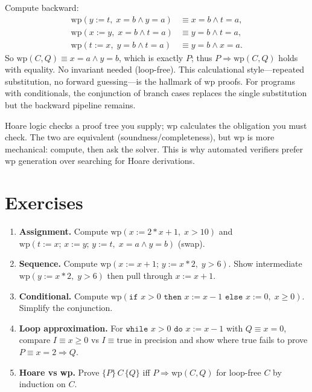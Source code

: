 Compute backward:
\[
\begin{aligned}
\text{wp}(y:=t,\;x=b\land y=a) &\equiv x=b\land t=a,\\
\text{wp}(x:=y,\;x=b\land t=a) &\equiv y=b\land t=a,\\
\text{wp}(t:=x,\;y=b\land t=a) &\equiv y=b\land x=a.
\end{aligned}
\]
So $\text{wp}(C,Q)\equiv x=a\land y=b$, which is exactly $P$; thus $P\Rightarrow\text{wp}(C,Q)$ holds with equality. No invariant needed (loop-free). This calculational style—repeated substitution, no forward guessing—is the hallmark of $\text{wp}$ proofs. For programs with conditionals, the conjunction of branch cases replaces the single substitution but the backward pipeline remains.

\begin{remark}
Hoare logic checks a proof tree you supply; $\text{wp}$ calculates the obligation you must check. The two are equivalent (soundness/completeness), but $\text{wp}$ is more mechanical: compute, then ask the solver. This is why automated verifiers prefer $\text{wp}$ generation over searching for Hoare derivations.
\end{remark}

\section{Exercises}
\label{sec:ch06-exercises}
\begin{enumerate}[label=E6.\arabic*, leftmargin=*, itemsep=0.6em]
    \item \textbf{Assignment.} Compute $\text{wp}(x:=2*x+1,\;x>10)$ and $\text{wp}(t:=x;\,x:=y;\,y:=t,\;x=a\land y=b)$ (swap).
    \item \textbf{Sequence.} Compute $\text{wp}(x:=x+1;\,y:=x*2,\;y>6)$. Show intermediate $\text{wp}(y:=x*2,\;y>6)$ then pull through $x:=x+1$.
    \item \textbf{Conditional.} Compute $\text{wp}(\texttt{if }x>0\texttt{ then }x:=x-1\texttt{ else }x:=0,\;x\ge0)$. Simplify the conjunction.
    \item \textbf{Loop approximation.} For $\texttt{while }x>0\texttt{ do }x:=x-1$ with $Q\equiv x=0$, compare $I\equiv x\ge0$ vs $I\equiv\text{true}$ in precision and show where $\text{true}$ fails to prove $P\equiv x=2\Rightarrow Q$.
    \item \textbf{Hoare vs wp.} Prove $\{P\}\,C\,\{Q\}$ iff $P\Rightarrow\text{wp}(C,Q)$ for loop-free $C$ by induction on $C$.
\end{enumerate}

